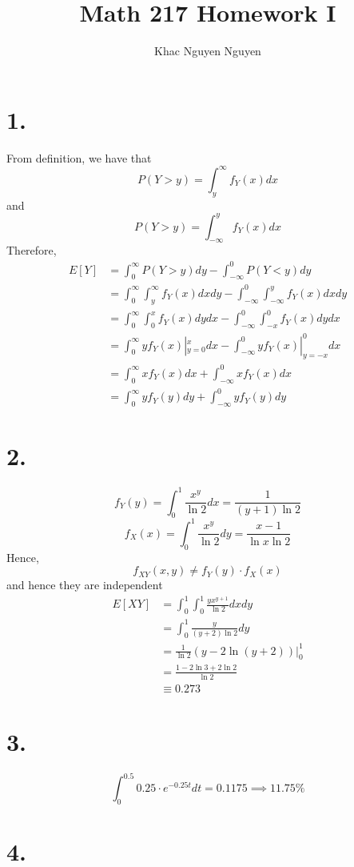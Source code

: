 \documentclass[11pt]{article}
\title{\textbf{Math 217 Homework I}}
\author{Khac Nguyen Nguyen}
\date{}
\begin{document}
\section*{1.}
From definition, we have that
\[
    P(Y>y) = \int_y^\infty f_Y(x) dx 
\]
and
\[
    P(Y>y) = \int_{-\infty}^y f_Y(x) dx 
\]
Therefore, 
\begin{equation*}
    \begin{aligned}
        E[Y] 
        &= \int_0^\infty P(Y>y) dy - \int_{-\infty}^0 P(Y<y) dy \\
        &= \int_0^\infty \int_y^{\infty} f_Y(x) dxdy - \int_{-\infty}^0 \int_{-\infty}^y f_Y(x) dxdy \\
        &= \int_0^\infty \int_0^x f_Y(x) dydx - \int_{-\infty}^0 \int_{-x}^0 f_Y(x) dydx \\
        &= \int_0^\infty yf_Y(x)|^x_{y=0} dx - \int_{-\infty}^0 yf_Y(x)|^0_{y=-x} dx \\
        &= \int_0^\infty xf_Y(x) dx + \int_{-\infty}^0 xf_Y(x) dx\\
        &= \int_0^\infty yf_Y(y) dy + \int_{-\infty}^0 yf_Y(y) dy
    \end{aligned}
\end{equation*}
\pagebreak
\section*{2.}
\[
    f_Y(y) = \int_0^1 \frac{x^y}{\ln2} dx = \frac{1}{(y+1)\ln2} 
\]
\[
    f_X(x) = \int_0^1 \frac{x^y}{\ln2} dy =  \frac{x-1}{\ln x \ln2}    
\]
Hence, 
\[
    f_{XY}(x,y) \ne f_Y(y) \cdot f_X(x)     
\]
and hence they are independent
\begin{equation*}
    \begin{aligned}
        E[XY] 
        &= \int_0^1 \int_0^1 \frac{yx^{y+1}}{\ln2} dx dy  \\
        &= \int_0^1 \frac{y}{(y+2)\ln2}dy \\
        &= \frac{1}{\ln2} (y-2\ln(y+2))|^1_0 \\
        &= \frac{1-2\ln3 + 2\ln2}{\ln2} \\
        &\equiv 0.273
    \end{aligned}
\end{equation*}
\pagebreak
\section*{3.}
\[
    \int_0^{0.5} 0.25 \cdot e^{-0.25t} dt = 0.1175 \implies 11.75\%
\]
\pagebreak
\section*{4.}
\end{document}

